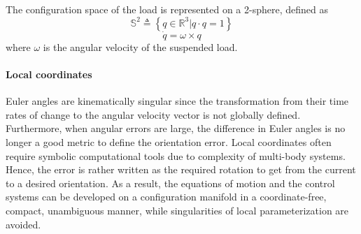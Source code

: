 The configuration space of the load is represented on a 2-sphere, defined as
\begin{equation}\label{key}
\mathbb{S}^2 \triangleq \left\lbrace q\in\mathbb{R}^{3}|q\cdot q=1\right\rbrace 
\end{equation}
\begin{equation}\label{key}
\dot{q} = \omega\times q
\end{equation}
where $ \omega $ is the angular velocity of the suspended load.

\paragraph{Local coordinates} Euler angles are kinematically singular since the transformation from their time rates of change to the angular velocity vector is not globally defined. Furthermore, when angular errors are large, the difference in Euler angles is no longer a good metric to define the orientation error. Local coordinates often require symbolic computational tools due to complexity of multi-body systems. Hence, the error is rather written as the required rotation to get from the current to a desired orientation. As a result, the equations of motion and the control systems can be developed on a configuration manifold in a coordinate-free, compact, unambiguous manner, while singularities of local parameterization are avoided.

